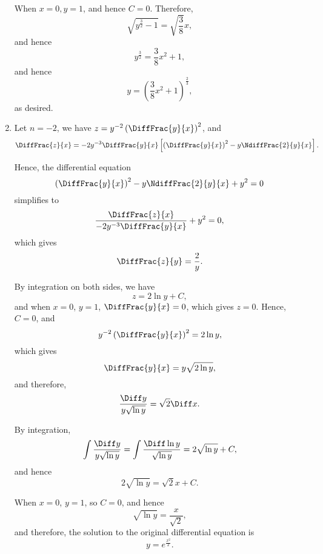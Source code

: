 \begin{enumerate}
          When \(x = 0, y = 1\), and hence \(C = 0\). Therefore,
          \[
              \sqrt{y^{\frac{3}{2}} - 1} = \sqrt{\frac{3}{8}} x,
          \]
          and hence
          \[
              y^{\frac{3}{2}} = \frac{3}{8} x^2 + 1,
          \]
          and hence
          \[
              y = \left(\frac{3}{8}x^2 + 1\right)^{\frac{2}{3}},
          \]
          as desired.

    \item Let \(n = -2\), we have \(z = y^{-2} \left(\DiffFrac{y}{x}\right)^2\), and
          \[
              \DiffFrac{z}{x} = -2y^{-3} \DiffFrac{y}{x} \left[\left(\DiffFrac{y}{x}\right)^2 - y \NdiffFrac{2}{y}{x}\right].
          \]

          Hence, the differential equation
          \[
              \left(\DiffFrac{y}{x}\right)^2 - y \NdiffFrac{2}{y}{x} + y^2 = 0
          \]
          simplifies to
          \[
              \frac{\DiffFrac{z}{x}}{-2y^{-3} \DiffFrac{y}{x}} + y^2 = 0,
          \]
          which gives
          \[
              \DiffFrac{z}{y}  = \frac{2}{y}.
          \]

          By integration on both sides, we have
          \[
              z = 2 \ln y + C,
          \]
          and when \(x = 0\), \(y = 1\), \(\DiffFrac{y}{x} = 0\), which gives \(z = 0\). Hence, \(C = 0\), and
          \[
              y^{-2} \left(\DiffFrac{y}{x}\right)^2 = 2 \ln y,
          \]
          which gives
          \[
              \DiffFrac{y}{x} = y\sqrt{2 \ln y},
          \]
          and therefore,
          \[
              \frac{\Diff y}{y \sqrt{\ln y}} = \sqrt{2} \Diff x.
          \]

          By integration,
          \[
              \int \frac{\Diff y}{y \sqrt{\ln y}} = \int \frac{\Diff \ln y}{\sqrt{\ln y}} = 2 \sqrt{\ln y} + C,
          \]
          and hence
          \[
              2 \sqrt{\ln y} = \sqrt{2} x + C.
          \]

          When \(x = 0\), \(y = 1\), so \(C = 0\), and hence
          \[
              \sqrt{\ln y} = \frac{x}{\sqrt{2}},
          \]
          and therefore, the solution to the original differential equation is
          \[
              y = e^{\frac{x^2}{2}}.
          \]
\end{enumerate}